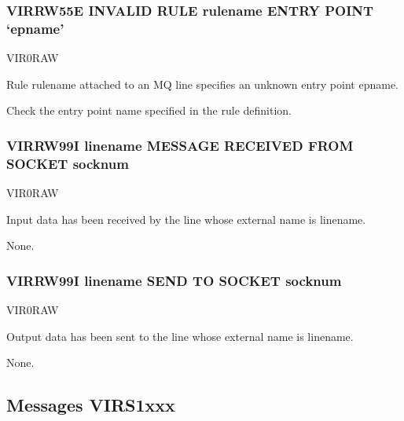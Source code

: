 \documentclass[letterpaper,10pt,english]{sphinxmanual}
\begin{document}
\subsubsection{VIRRW55E INVALID RULE rulename ENTRY POINT ‘epname’}
\label{\detokenize{messages:virrw55e-invalid-rule-rulename-entry-point-epname}}\begin{description}
\sphinxAtStartPar
VIR0RAW

\sphinxAtStartPar
Rule rulename attached to an MQ line specifies an unknown entry point epname.

\sphinxAtStartPar
Check the entry point name specified in the rule definition.

\end{description}


\subsubsection{VIRRW99I linename MESSAGE RECEIVED FROM SOCKET socknum}
\label{\detokenize{messages:virrw99i-linename-message-received-from-socket-socknum}}\begin{description}
\sphinxAtStartPar
VIR0RAW

\sphinxAtStartPar
Input data has been received by the line whose external name is linename.

\sphinxAtStartPar
None.

\end{description}


\subsubsection{VIRRW99I linename SEND TO SOCKET socknum}
\label{\detokenize{messages:virrw99i-linename-send-to-socket-socknum}}\begin{description}
\sphinxAtStartPar
VIR0RAW

\sphinxAtStartPar
Output data has been sent to the line whose external name is linename.

\sphinxAtStartPar
None.

\end{description}


\subsection{Messages VIRS1xxx}
\label{\detokenize{messages:messages-virs1xxx}}
\end{document}
